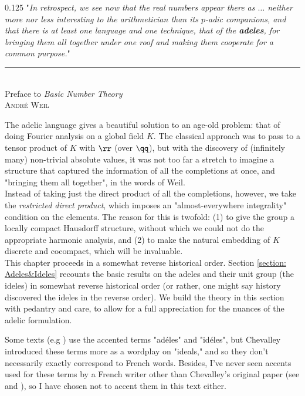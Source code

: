 \documentclass[11pt, x11names, openany]{book}
\newenvironment{myquote}[3]
{
    \begin{flushright}
    \begin{adjustwidth}{0.125\textwidth}{}
    "\textit{\small #1}"\\
    \end{adjustwidth}
    \rule{.75\linewidth}{0.5pt}\\
    #2\\ \textsc{#3}

}
{
    \end{flushright}
}
\begin{document}
\begin{myquote}{In retrospect, we see now that the real numbers appear there as $\ldots$ neither more nor less interesting to the arithmetician than its $p$-adic companions, and that there is at least one language and one technique, that of the \textbf{adeles}, for bringing them all together under one roof and making them cooperate for a common purpose.}{Preface to \textit{Basic Number Theory}}{Andr\'e Weil}

\end{myquote}


The adelic language gives a beautiful solution to an age-old problem: that of doing Fourier analysis on a global field $K$. The classical approach was to pass to a tensor product of $K$ with $\rr$ (over $\qq$), but with the discovery of (infinitely many) non-trivial absolute values, it was not too far a stretch to imagine a structure that captured the information of all the completions at once, and "bringing them all together", in the words of Weil.\\

Instead of taking just the direct product of all the completions, however, we take the \textit{restricted direct product}, which imposes an "almost-everywhere integrality" condition on the elements. The reason for this is twofold: (1) to give the group a locally compact Hausdorff structure, without which we could not do the appropriate harmonic analysis, and (2) to make the natural embedding of $K$ discrete and cocompact, which will be invaluable.\\


This chapter proceeds in a somewhat reverse historical order. Section \ref{section: Adeles&Ideles} recounts the basic results on the adeles and their unit group (the ideles) in somewhat reverse historical order (or rather, one might say history discovered the ideles in the reverse order). We build the theory in this section with pedantry and care, to allow for a full appreciation for the nuances of the adelic formulation.

\begin{remark}
    Some texts (e.g \cite{bernstein2013introduction}) use the accented terms "ad\'eles" and "id\'eles", but Chevalley introduced these terms more as a wordplay on "ideals," and so they don't necessarily exactly correspond to French words. Besides, I've never seen accents used for these terms by a French writer other than Chevalley's original paper (see \cite{weil1974basic} and \cite{lang1994algebraic}), so I have chosen not to accent them in this text either.
\end{remark}
\end{document}
